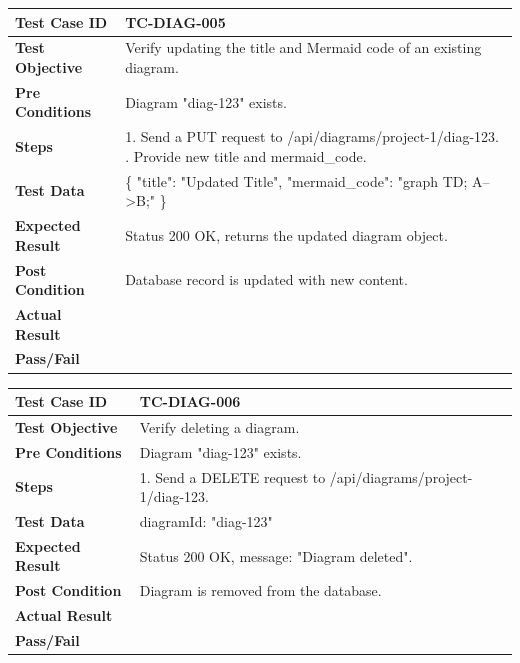 \begin{longtable}{|p{}|p{}|}
\hline
\textbf{Test Case ID} & TC-DIAG-005 \\ \hline
\textbf{Test Objective} & Verify updating the title and Mermaid code of an existing diagram. \\ \hline
\textbf{Pre Conditions} & Diagram "diag-123" exists. \\ \hline
\textbf{Steps} & 
1. Send a PUT request to /api/diagrams/project-1/diag-123. \newline
2. Provide new title and mermaid\_code. \\ \hline
\textbf{Test Data} & \{ "title": "Updated Title", "mermaid\_code": "graph TD; A-->B;" \} \\ \hline
\textbf{Expected Result} & Status 200 OK, returns the updated diagram object. \\ \hline
\textbf{Post Condition} & Database record is updated with new content. \\ \hline
\textbf{Actual Result} &  \\ \hline
\textbf{Pass/Fail} &  \\ \hline
\end{longtable}

\begin{longtable}{|p{}|p{}|}
\hline
\textbf{Test Case ID} & TC-DIAG-006 \\ \hline
\textbf{Test Objective} & Verify deleting a diagram. \\ \hline
\textbf{Pre Conditions} & Diagram "diag-123" exists. \\ \hline
\textbf{Steps} & 
1. Send a DELETE request to /api/diagrams/project-1/diag-123. \\ \hline
\textbf{Test Data} & diagramId: "diag-123" \\ \hline
\textbf{Expected Result} & Status 200 OK, message: "Diagram deleted". \\ \hline
\textbf{Post Condition} & Diagram is removed from the database. \\ \hline
\textbf{Actual Result} &  \\ \hline
\textbf{Pass/Fail} &  \\ \hline
\end{longtable}

